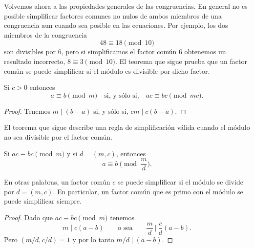 \documentclass[12pt,a4paper]{book}
\begin{document}
    Volvemos ahora a las propiedades generales de las congruencias. En general no es
    posible simplificar factores comunes no nulos de ambos miembros de una congruencia
    aun cuando sea posible en las ecuaciones. Por ejemplo, los dos miembros de la
    congruencia
    \begin{equation*}
        48\equiv18\pmod{10}
    \end{equation*}
    son divisibles por 6, pero si simplificamos el factor común 6 obtenemos un resultado
    incorrecto, $8\equiv3\pmod{10}$. El teorema que sigue prueba que un factor común se
    puede simplificar si el módulo es divisible por dicho factor.

    \begin{teorema}
        Si $c>0$ entonces
        \begin{equation*}
            a\equiv b\pmod{m}\quad\text{si, y sólo si,}\quad ac\equiv bc\pmod{mc}.
        \end{equation*}
    \end{teorema}

    \begin{proof}
        Tenemos $m\mid(b-a)$ si, y sólo si, $cm\mid c(b-a)$.
    \end{proof}

    El teorema que sigue describe una regla de simplificación válida cuando el módulo no
    sea divisible por el factor común.

    \begin{teorema}
        Si $ac\equiv bc\pmod{m}$ y si $d=(m,c)$, entonces
        \begin{equation*}
            a\equiv b\pmod{\frac{m}{d}}.
        \end{equation*}
    \end{teorema}

    En otras palabras, un factor común $c$ se puede simplificar si el módulo se divide por
    $d=(m,c)$. En particular, un factor común que es primo con el módulo se puede
    simplificar siempre.

    \begin{proof}
        Dado que $ac\equiv bc\pmod{m}$ tenemos
        \begin{equation*}
            m\mid c(a-b)\qquad\text{o sea}\qquad\frac{m}{d}\ \bigg|\ \frac{c}{d}(a-b).
        \end{equation*}
        Pero $(m/d,c/d)=1$ y por lo tanto $m/d\mid(a-b)$.
    \end{proof}
\end{document}
